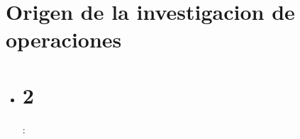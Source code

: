 \documentclass{article}
\begin{document}
\section{Origen de la investigacion de operaciones}
\begin{itemize}
    \item[] \section*{2}:
\end{itemize}
\end{document}
